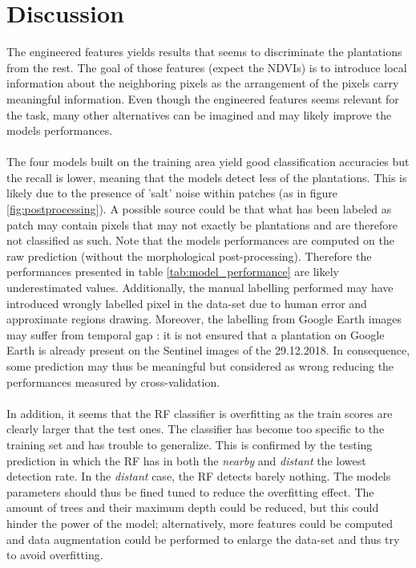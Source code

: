 \documentclass[a4paper, 12pt]{article}
\begin{document}
\section{Discussion}
    The engineered features yields results that seems to discriminate the plantations from the rest. The goal of those features (expect the NDVIs) is to introduce local information about the neighboring pixels as the arrangement of the pixels carry meaningful information. Even though the engineered features seems relevant for the task, many other alternatives can be imagined and may likely improve the models performances.
    \\
    \\
    The four models built on the training area yield good classification accuracies but the recall is lower, meaning that the models detect less of the plantations. This is likely due to the presence of 'salt' noise within patches (as in figure \ref{fig:postprocessing}). A possible source could be that what has been labeled as patch may contain pixels that may not exactly be plantations and are therefore not classified as such. Note that the models performances are computed on the raw prediction (without the morphological post-processing). Therefore the performances presented in table \ref{tab:model_performance} are likely underestimated values. Additionally, the manual labelling performed may have introduced wrongly labelled pixel in the data-set due to human error and approximate regions drawing. Moreover, the labelling from Google Earth images may suffer from temporal gap : it is not ensured that a plantation on Google Earth is already present on the Sentinel images of the 29.12.2018. In consequence, some prediction may thus be meaningful but considered as wrong reducing the performances measured by cross-validation.
    \\
    \\
    In addition, it seems that the RF classifier is overfitting as the train scores are clearly larger that the test ones. The classifier has become too specific to the training set and has trouble to generalize. This is confirmed by the testing prediction in which the RF has in both the \textit{nearby} and \textit{distant} the lowest detection rate. In the \textit{distant} case, the RF detects barely nothing. The models parameters should thus be fined tuned to reduce the overfitting effect. The amount of trees and their maximum depth could be reduced, but this could hinder the power of the model; alternatively, more features could be computed and data augmentation could be performed to enlarge the data-set and thus try to avoid overfitting.
\end{document}
